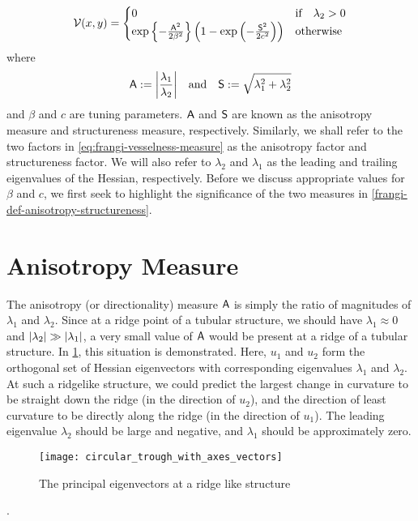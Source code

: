 \begin{equation} \label{eq:frangi-vesselness-measure}
\V(x,y) = \begin{cases}
0 & \text{if} \quad \lambda_2 > 0 \\
\exp\left\{-\frac{\Am^2}{2\beta^2}\right\}
\left(1 - \exp\left(-\frac{\Sm^2}{2c^2}\right)\right) & \text{otherwise}
\end{cases} \end{equation}
where
\begin{equation} \label{frangi-def-anisotropy-structureness}
\Am := \abs*{\frac{\lambda_1}{\lambda_2}}
\quad \textrm{and} \quad 
\Sm := \sqrt{\lambda_1^2 + \lambda_2^2}
\end{equation}
and $\beta$ and $c$ are tuning parameters. $\Am$ and $\Sm$ are known as the anisotropy measure and structureness measure, respectively. Similarly, we shall refer to the two factors in \cref{eq:frangi-vesselness-measure} as the anisotropy factor and structureness factor. We will also refer to $\lambda_2$ and $\lambda_1$ as the leading and trailing eigenvalues of the Hessian, respectively. Before we discuss appropriate values for $\beta$ and $c$, we first seek to highlight the significance of the two measures in \cref{frangi-def-anisotropy-structureness}.

\section{Anisotropy Measure} \label{sec:frangi.anisotropy}
The anisotropy (or directionality) measure $\Am$ is simply the ratio of magnitudes of $\lambda_1$ and $\lambda_2$. Since at a ridge point of a tubular structure, we should have $\lambda_1 \approx 0$ and $\abs*{\lambda_2} \gg \abs*{\lambda_1}$,
a very small value of $\Am$ would be present at a ridge of a tubular structure.
In \cref{fig:circular_trough_with_axes_vectors}, this situation is demonstrated. Here, $u_1$ and $u_2$ form the orthogonal set of Hessian eigenvectors with corresponding eigenvalues $\lambda_1$ and $\lambda_2$. At such a ridgelike structure, we could predict the largest change in curvature to be straight down the ridge (in the direction of $u_2$), and the direction of least curvature to be directly along the ridge (in the direction  of $u_1$). The leading eigenvalue $\lambda_2$ should be large and negative, and $\lambda_1$ should be approximately zero.

\begin{figure} \centering
  \texttt{[image: circular\_trough\_with\_axes\_vectors]}
  \caption{The principal eigenvectors at a ridge like structure} 
  \label{fig:circular_trough_with_axes_vectors}
\end{figure}. 


